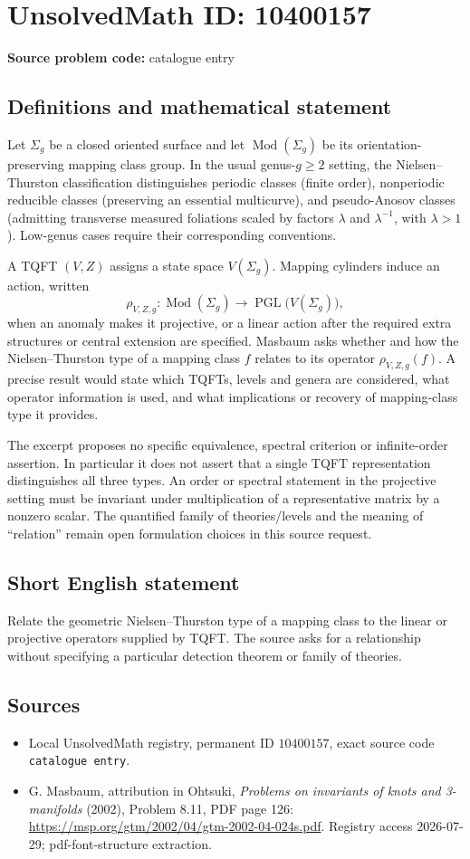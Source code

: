 \documentclass[11pt]{article}
\begin{document}
\section*{UnsolvedMath ID: 10400157}
\textbf{Source problem code:} catalogue entry
\subsection{Definitions and mathematical statement}
Let \(\Sigma_g\) be a closed oriented surface and let \(\operatorname{Mod}(\Sigma_g)\) be its orientation-preserving mapping class group. In the usual genus-\(g\geq2\) setting, the Nielsen--Thurston classification distinguishes periodic classes (finite order), nonperiodic reducible classes (preserving an essential multicurve), and pseudo-Anosov classes (admitting transverse measured foliations scaled by factors \(\lambda\) and \(\lambda^{-1}\), with \(\lambda>1\)). Low-genus cases require their corresponding conventions.

A TQFT \((V,Z)\) assigns a state space \(V(\Sigma_g)\). Mapping cylinders induce an action, written
\[\rho_{V,Z,g}:\operatorname{Mod}(\Sigma_g)\longrightarrow
\operatorname{PGL}\bigl(V(\Sigma_g)\bigr),\]
when an anomaly makes it projective, or a linear action after the required extra structures or central extension are specified. Masbaum asks whether and how the Nielsen--Thurston type of a mapping class \(f\) relates to its operator \(\rho_{V,Z,g}(f)\). A precise result would state which TQFTs, levels and genera are considered, what operator information is used, and what implications or recovery of mapping-class type it provides.

The excerpt proposes no specific equivalence, spectral criterion or infinite-order assertion. In particular it does not assert that a single TQFT representation distinguishes all three types. An order or spectral statement in the projective setting must be invariant under multiplication of a representative matrix by a nonzero scalar. The quantified family of theories/levels and the meaning of ``relation'' remain open formulation choices in this source request.
\subsection{Short English statement}
Relate the geometric Nielsen--Thurston type of a mapping class to the linear or projective operators supplied by TQFT. The source asks for a relationship without specifying a particular detection theorem or family of theories.
\subsection{Sources}
\begin{itemize}
\item Local UnsolvedMath registry, permanent ID \(10400157\), exact source code \texttt{catalogue entry}.
\item G. Masbaum, attribution in Ohtsuki, \emph{Problems on invariants of knots and 3-manifolds} (2002), Problem 8.11, PDF page 126: \url{https://msp.org/gtm/2002/04/gtm-2002-04-024s.pdf}. Registry access 2026-07-29; pdf-font-structure extraction.
\end{itemize}
\end{document}
